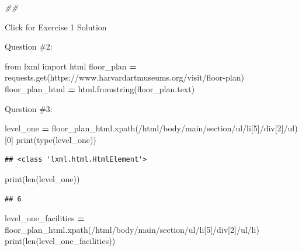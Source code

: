 \documentclass[
]{book}
\newenvironment{Shaded}{\begin{snugshade}}{\end{snugshade}}
\newcommand{\BuiltInTok}[1]{#1}
\newcommand{\CommentTok}[1]{\textcolor[rgb]{0.56,0.35,0.01}{\textit{#1}}}
\newcommand{\DecValTok}[1]{\textcolor[rgb]{0.00,0.00,0.81}{#1}}
\newcommand{\ImportTok}[1]{#1}
\newcommand{\NormalTok}[1]{#1}
\newcommand{\OperatorTok}[1]{\textcolor[rgb]{0.81,0.36,0.00}{\textbf{#1}}}
\newcommand{\StringTok}[1]{\textcolor[rgb]{0.31,0.60,0.02}{#1}}
\begin{document}
\begin{Shaded}
\begin{Highlighting}[]
\CommentTok{\#\#}
\end{Highlighting}
\end{Shaded}

{Click for Exercise 1 Solution}

Question \#2:

\begin{Shaded}
\begin{Highlighting}[]
\ImportTok{from}\NormalTok{ lxml }\ImportTok{import}\NormalTok{ html}
\NormalTok{floor\_plan }\OperatorTok{=}\NormalTok{ requests.get(}\StringTok{\textquotesingle{}https://www.harvardartmuseums.org/visit/floor{-}plan\textquotesingle{}}\NormalTok{)}
\NormalTok{floor\_plan\_html }\OperatorTok{=}\NormalTok{ html.fromstring(floor\_plan.text)}
\end{Highlighting}
\end{Shaded}

Question \#3:

\begin{Shaded}
\begin{Highlighting}[]
\NormalTok{level\_one }\OperatorTok{=}\NormalTok{ floor\_plan\_html.xpath(}\StringTok{\textquotesingle{}/html/body/main/section/ul/li[5]/div[2]/ul\textquotesingle{}}\NormalTok{)[}\DecValTok{0}\NormalTok{]}
\BuiltInTok{print}\NormalTok{(}\BuiltInTok{type}\NormalTok{(level\_one))}
\end{Highlighting}
\end{Shaded}

\begin{verbatim}
## <class 'lxml.html.HtmlElement'>
\end{verbatim}

\begin{Shaded}
\begin{Highlighting}[]
\BuiltInTok{print}\NormalTok{(}\BuiltInTok{len}\NormalTok{(level\_one))}
\end{Highlighting}
\end{Shaded}

\begin{verbatim}
## 6
\end{verbatim}

\begin{Shaded}
\begin{Highlighting}[]
\NormalTok{level\_one\_facilities }\OperatorTok{=}\NormalTok{ floor\_plan\_html.xpath(}\StringTok{\textquotesingle{}/html/body/main/section/ul/li[5]/div[2]/ul/li\textquotesingle{}}\NormalTok{)}
\BuiltInTok{print}\NormalTok{(}\BuiltInTok{len}\NormalTok{(level\_one\_facilities))}
\end{Highlighting}
\end{Shaded}
\end{document}
